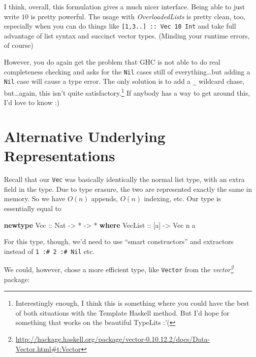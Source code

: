 \documentclass[]{article}
\newenvironment{Shaded}{}{}
\newcommand{\DataTypeTok}[1]{\textcolor[rgb]{0.56,0.13,0.00}{#1}}
\newcommand{\KeywordTok}[1]{\textcolor[rgb]{0.00,0.44,0.13}{\textbf{#1}}}
\newcommand{\NormalTok}[1]{#1}
\newcommand{\OperatorTok}[1]{\textcolor[rgb]{0.40,0.40,0.40}{#1}}
\newcommand{\OtherTok}[1]{\textcolor[rgb]{0.00,0.44,0.13}{#1}}
\renewcommand{\href}[2]{#2\footnote{\url{#1}}}
\begin{document}
I think, overall, this formulation gives a much nicer interface. Being able to
just write \(10\) is pretty powerful. The usage with \emph{OverloadedLists} is
pretty clean, too, especially when you can do things like
\texttt{{[}1,3..{]}\ ::\ Vec\ 10\ Int} and take full advantage of list syntax
and succinct vector types. (Minding your runtime errors, of course)

However, you do again get the problem that GHC is not able to do real
completeness checking and asks for the \texttt{Nil} cases still of
everything\ldots but adding a \texttt{Nil} case will cause a type error. The
only solution is to add a \texttt{\_} wildcard chase, but\ldots again, this
isn't quite satisfactory.\footnote{Interestingly enough, I think this is
  something where you could have the best of both situations with the Template
  Haskell method. But I'd hope for something that works on the beautiful
  TypeLits :'(} If anybody has a way to get around this, I'd love to know :)

\hypertarget{alternative-underlying-representations}{%
\section{Alternative Underlying
Representations}\label{alternative-underlying-representations}}

Recall that our \texttt{Vec} was basically identically the normal list type,
with an extra field in the type. Due to type erasure, the two are represented
exactly the same in memory. So we have \(O(n)\) appends, \(O(n)\) indexing, etc.
Our type is essentially equal to

\begin{Shaded}
\begin{Highlighting}[]
\KeywordTok{newtype} \DataTypeTok{Vec}\OtherTok{ ::} \DataTypeTok{Nat} \OtherTok{{-}>} \OperatorTok{*} \OtherTok{{-}>} \OperatorTok{*} \KeywordTok{where}
    \DataTypeTok{VecList}\OtherTok{ ::}\NormalTok{ [a] }\OtherTok{{-}>} \DataTypeTok{Vec}\NormalTok{ n a}
\end{Highlighting}
\end{Shaded}

For this type, though, we'd need to use ``smart constructors'' and extractors
instead of \texttt{1\ :\#\ 2\ :\#\ Nil} etc.

We could, however, chose a more efficient type, like \texttt{Vector} from the
\emph{\href{http://hackage.haskell.org/package/vector-0.10.12.2/docs/Data-Vector.html\#t:Vector}{vector}}
package:
\end{document}
